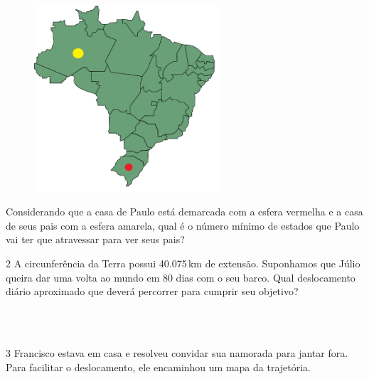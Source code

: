 \begin{figure}[H]
\centering\includegraphics[width=2.73952in,height=2.725in]{./imgSAEB_8_MAT/media/image36.png}
\end{figure}


Considerando que a casa de Paulo está demarcada com a esfera vermelha e
a casa de seus pais com a esfera amarela, qual é o número mínimo de
estados que Paulo vai ter que atravessar para ver seus pais?


\num{2} A circunferência da Terra possui 40.075\,km de extensão. Suponhamos
que Júlio queira dar uma volta ao mundo em 80 dias com o seu barco. Qual
deslocamento diário aproximado que deverá percorrer para cumprir seu
objetivo?

\\
\\

\pagebreak

\num{3} Francisco estava em casa e resolveu convidar sua namorada para jantar
fora. Para facilitar o deslocamento, ele encaminhou um mapa da
trajetória.



